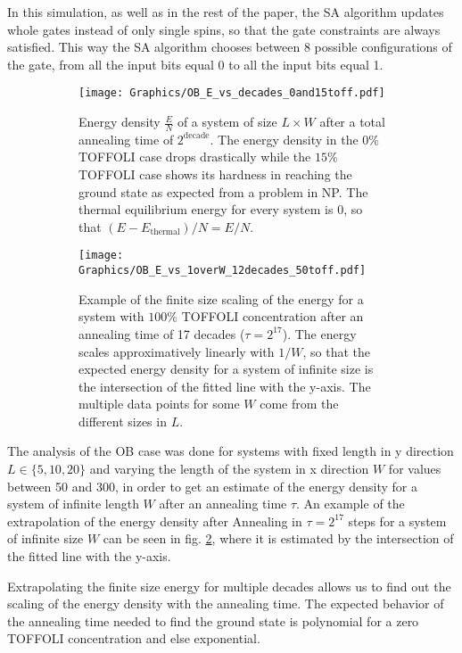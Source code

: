 In this simulation, as well as in the rest of the paper, the SA algorithm updates whole gates instead of only single spins, so that the gate constraints are always satisfied.
This way the SA algorithm chooses between 8 possible configurations of the gate, from all the input bits equal 0 to all the input bits equal 1.

\begin{figure}[hbtp]
  \begin{subfigure}{.5\textwidth}
    \centering
    \texttt{[image: Graphics/OB\_E\_vs\_decades\_0and15toff.pdf]}
    \caption{Energy density $\frac{E}{N}$ of a system of size $L \times W$ after a total annealing time of $2^{\text{decade}}$. The energy density in the $0\%$ TOFFOLI case drops drastically while the $15\%$ TOFFOLI case shows its hardness in reaching the ground state as expected from a problem in NP. The thermal equilibrium energy for every system is 0, so that $(E-E_\text{thermal})/{N} =  {E}/{N}$.\label{fig:OB_E_vs_dec}}
  \end{subfigure}
  \begin{subfigure}{.5\textwidth}
    \centering
    \texttt{[image: Graphics/OB\_E\_vs\_1overW\_12decades\_50toff.pdf]}
    \caption{Example of the finite size scaling of the energy for a system with $100\%$ TOFFOLI concentration after an annealing time of 17 decades ($\tau=2^{17}$). The energy scales approximatively linearly with $1/W$, so that the expected energy density for a system of infinite size is the intersection of the fitted line with the y-axis.
    The multiple data points for some $W$ come from the different sizes in $L$.\label{fig:OB_E_vs_1overW}}
  \end{subfigure}
  \caption{\label{fig:OB_intro}}
\end{figure}

The analysis of the OB case was done for systems with fixed length in y direction $L\in \{ 5,10,20 \}$ and varying the length of the system in x direction $W$ for values between 50 and 300, in order to get an estimate of the energy density for a system of infinite length $W$ after an annealing time $\tau$.
An example of the extrapolation of the energy density after Annealing in $\tau=2^{17}$ steps for a system of infinite size $W$ can be seen in fig. \ref{fig:OB_E_vs_1overW}, where it is estimated by the intersection of the fitted line with the y-axis.

Extrapolating the finite size energy for multiple decades allows us to find out the scaling of the energy density with the annealing time.
The expected behavior of the annealing time needed to find the ground state is polynomial for a zero TOFFOLI concentration and else exponential.

